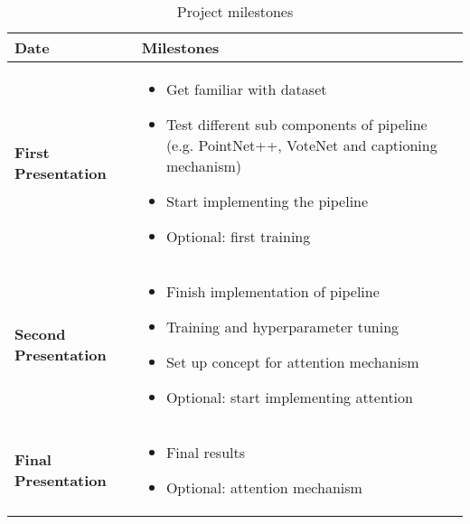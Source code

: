 \documentclass[10pt,twocolumn,letterpaper]{article}
\begin{document}
\begin{table*}
	\centering
	\begin{tabularx}{\textwidth}{l|l}
	\textbf{Date} & \textbf{Milestones} \\
	\hline
	\textbf{First Presentation} & 
	\begin{minipage}[t]{\textwidth}
		\begin{itemize}[nosep, wide=0pt, leftmargin=*, after=\strut]
			\item Get familiar with dataset
			\item Test different sub components of pipeline (e.g. PointNet++, VoteNet and captioning mechanism)
			\item Start implementing the pipeline
			\item Optional: first training
		\end{itemize}  
	\end{minipage}\\
	\hline
	\textbf{Second Presentation} & 
	\begin{minipage}[t]{\linewidth}
		\begin{itemize}[nosep, wide=0pt, leftmargin=*, after=\strut]
			\item Finish implementation of pipeline
			\item Training and hyperparameter tuning
			\item Set up concept for attention mechanism
			\item Optional: start implementing attention
		\end{itemize}  
	\end{minipage}\\
	\hline
	\textbf{Final Presentation} & 
	\begin{minipage}[t]{\linewidth}
		\begin{itemize}[nosep, wide=0pt, leftmargin=*, after=\strut]
			\item Final results
			\item Optional: attention mechanism
		\end{itemize}  
	\end{minipage}\\
	\end{tabularx}
	\caption{Project milestones}
	\label{tab:milestones}
\end{table*}

{\small


}
\end{document}
